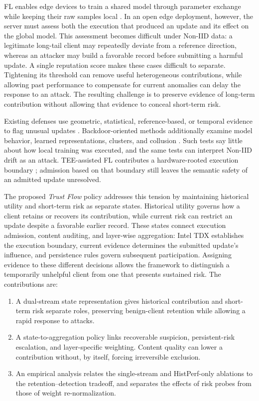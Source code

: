 \documentclass[conference,compsoc]{IEEEtran}
\newenvironment{tightenumerate}{%
    \begin{enumerate}\setlength{\itemsep}{1pt}\setlength{\parskip}{0pt}\setlength{\parsep}{0pt}}{\end{enumerate}}
\begin{document}
FL enables edge devices to train a shared model through parameter exchange while keeping their raw samples local \cite{kairouz2021flsurvey,mcmahan2017fedavg}. In an open edge deployment, however, the server must assess both the execution that produced an update and its effect on the global model. This assessment becomes difficult under Non-IID data: a legitimate long-tail client may repeatedly deviate from a reference direction, whereas an attacker may build a favorable record before submitting a harmful update. A single reputation score makes these cases difficult to separate. Tightening its threshold can remove useful heterogeneous contributions, while allowing past performance to compensate for current anomalies can delay the response to an attack. The resulting challenge is to preserve evidence of long-term contribution without allowing that evidence to conceal short-term risk.

Existing defenses use geometric, statistical, reference-based, or temporal evidence to flag unusual updates \cite{blanchard2017krum,yin2018byzantine,cao2021fltrust,fung2020foolsgold,fldetector2022}. Backdoor-oriented methods additionally examine model behavior, learned representations, clusters, and collusion \cite{deepsight2022,flame2022,crowdguard2024,roseagg}. Such tests say little about how local training was executed, and the same tests can interpret Non-IID drift as an attack. TEE-assisted FL contributes a hardware-rooted execution boundary \cite{r1_tee_integrity,xu2021distributed,r5_tee_mitigating,lu2025tmt}; admission based on that boundary still leaves the semantic safety of an admitted update unresolved.

The proposed \emph{Trust Flow} policy addresses this tension by maintaining historical utility and short-term risk as separate states. Historical utility governs how a client retains or recovers its contribution, while current risk can restrict an update despite a favorable earlier record. These states connect execution admission, content auditing, and layer-wise aggregation: Intel TDX establishes the execution boundary, current evidence determines the submitted update's influence, and persistence rules govern subsequent participation. Assigning evidence to these different decisions allows the framework to distinguish a temporarily unhelpful client from one that presents sustained risk. The contributions are:
\begin{tightenumerate}
    \item A dual-stream state representation gives historical contribution and short-term risk separate roles, preserving benign-client retention while allowing a rapid response to attacks.
    \item A state-to-aggregation policy links recoverable suspicion, persistent-risk escalation, and layer-specific weighting. Content quality can lower a contribution without, by itself, forcing irreversible exclusion.
    \item An empirical analysis relates the single-stream and HistPerf-only ablations to the retention--detection tradeoff, and separates the effects of risk probes from those of weight re-normalization.
\end{tightenumerate}
\end{document}
